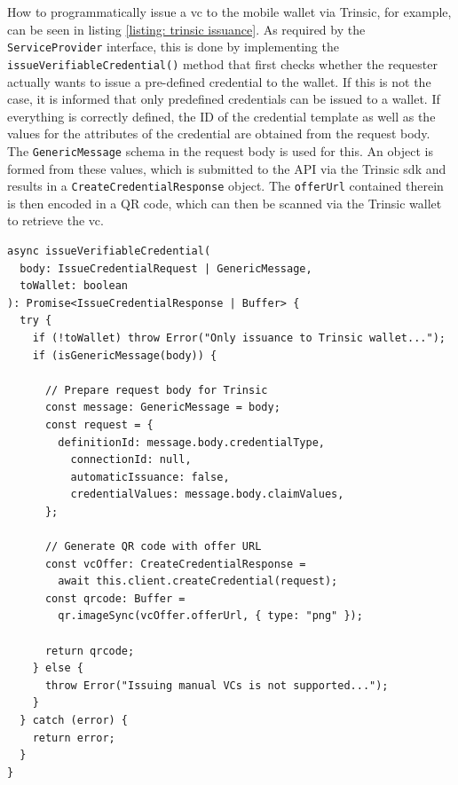     How to programmatically issue a \ac{vc} to the mobile wallet via Trinsic, for example, can be seen in listing \ref{listing: trinsic issuance}. As required by the \texttt{ServiceProvider} interface, this is done by implementing the \texttt{issueVerifiableCredential()} method that first checks whether the requester actually wants to issue a pre-defined credential to the wallet. If this is not the case, it is informed that only predefined credentials can be issued to a wallet. If everything is correctly defined, the ID of the credential template as well as the values for the attributes of the credential are obtained from the request body. The \texttt{GenericMessage} schema in the request body is used for this. An object is formed from these values, which is submitted to the API via the Trinsic \ac{sdk} and results in a \texttt{CreateCredentialResponse} object. The \texttt{offerUrl} contained therein is then encoded in a QR code, which can then be scanned via the Trinsic wallet to retrieve the \ac{vc}. 
    \newline
    
    \begin{lstlisting}[style=ES6, caption=\ac{vc} issuance with Trinsic, label={listing: trinsic issuance}]
async issueVerifiableCredential(
  body: IssueCredentialRequest | GenericMessage,
  toWallet: boolean
): Promise<IssueCredentialResponse | Buffer> {
  try {
    if (!toWallet) throw Error("Only issuance to Trinsic wallet...");
    if (isGenericMessage(body)) {
    
      // Prepare request body for Trinsic
      const message: GenericMessage = body;
      const request = {
        definitionId: message.body.credentialType,
          connectionId: null,
          automaticIssuance: false,
          credentialValues: message.body.claimValues,
      };
      
      // Generate QR code with offer URL
      const vcOffer: CreateCredentialResponse = 
        await this.client.createCredential(request);
      const qrcode: Buffer = 
        qr.imageSync(vcOffer.offerUrl, { type: "png" });
        
      return qrcode;
    } else {
      throw Error("Issuing manual VCs is not supported...");
    }
  } catch (error) {
    return error;
  }
}\end{lstlisting}

